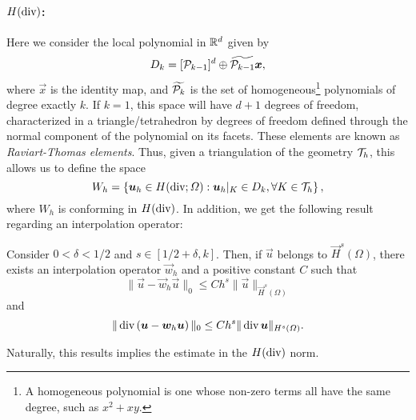\paragraph{$H(\dive)$:} Here we consider the local polynomial in $\R^d$ given by
\begin{equation}
    D_k = [\P_{k-1}]^d \oplus \widetilde{\P_{k-1}} \vec x,
\end{equation}
where $\vec x$ is the identity map, and $\widetilde{\P_k}$ is the set of homogeneous\footnote{A homogeneous polynomial is one whose non-zero terms all have the same degree, such as $x^2 + xy$.} polynomials of degree exactly $k$. If $k=1$, this space will have $d+1$ degrees of freedom, characterized in a triangle/tetrahedron by degrees of freedom defined through the normal component of the polynomial on its facets. These elements are known as \emph{Raviart-Thomas elements}. Thus, given a triangulation of the geometry $\T_h$, this allows us to define the space
\begin{equation}
    W_h = \left\{ \vec u_h \in H(\dive; \Omega):  \vec u_h|_K \in D_k , \forall K \in \T_h \right\},
\end{equation}
where $W_h$ is conforming in $H(\dive)$. In addition, we get the following result regarding an interpolation operator: 
\begin{theorem}\label{thm:Hdiv-interpolation}
    Consider $0<\delta<1/2$ and $s\in [1/2+\delta, k]$. Then, if $\vec u$ belongs to $\vec H^s(\Omega)$, there exists an interpolation operator $\vec w_h$ and a positive constant $C$ such that
    \begin{equation}
        \|\vec u - \vec w_h \vec u\|_0 \leq C h^s \| \vec u \|_{\vec H^s(\Omega)}
    \end{equation}
    and 
    \begin{equation}
        \|\dive\left(\vec u - \vec w_h \vec u\right)\|_0 \leq C h^s \| \dive \vec u \|_{H^s(\Omega)}.
    \end{equation}
\end{theorem}

Naturally, this results implies the estimate in the $H(\dive)$ norm. 
